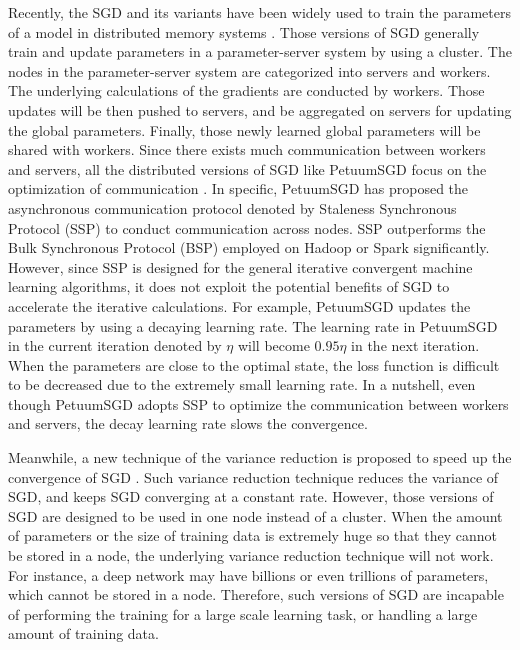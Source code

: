 \documentclass[preprint,review,11pt,a4paper]{elsarticle}
\begin{document}
Recently, the SGD and its variants have been widely used to train the parameters of a model in distributed memory systems \cite{Dean:2012wx, Li:2014tt, Xing:2015ib}. Those versions of SGD generally train and update parameters in a parameter-server system by using a cluster. The nodes in the parameter-server system are categorized into servers and workers. The underlying calculations of the gradients are conducted by workers. Those updates will be then pushed to servers, and be aggregated on servers for updating the global parameters. Finally, those newly learned global parameters will be shared with workers. Since there exists much communication between workers and servers, all the distributed versions of SGD like PetuumSGD focus on the optimization of communication \cite{Xing:2015ib}.  In specific, PetuumSGD has proposed the asynchronous communication protocol denoted by Staleness Synchronous Protocol (SSP) to conduct communication across nodes. SSP outperforms the Bulk Synchronous Protocol (BSP) employed on Hadoop or Spark significantly. However, since SSP is designed for the general iterative convergent machine learning algorithms, it does not exploit the potential benefits of SGD to accelerate the iterative calculations. For example, PetuumSGD updates the parameters by using a decaying learning rate. The learning rate in PetuumSGD in the current iteration denoted by $\eta$ will become $0.95\eta$ in the next iteration. When the parameters are close to the optimal state, the loss function is difficult to be decreased due to the extremely small learning rate. In a nutshell,   even though PetuumSGD adopts SSP  to optimize the communication between workers and servers, the decay learning rate slows the convergence.

Meanwhile, a new technique of the variance reduction is proposed to speed up the convergence of SGD \cite{Johnson:9MAvkbgy, Zhao:SZfxEHHg, Reddi:2015vj}. Such variance reduction technique reduces the variance of SGD, and keeps SGD converging at a constant rate.   However, those versions of SGD are designed to be used in one node instead of a cluster. When the amount of parameters or the size of training data is extremely huge so that they cannot be stored in a node, the underlying variance reduction technique will not work. For instance, a deep network may have billions or even trillions of parameters, which cannot be stored in a node. Therefore, such versions of SGD are incapable of performing the training for a large scale learning task, or handling a large amount of training data.
\end{document}
